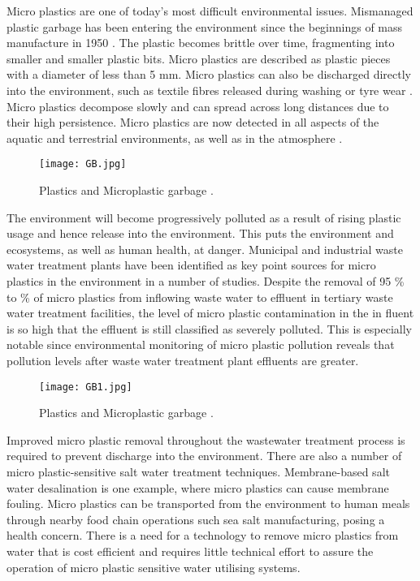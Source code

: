 \documentclass[12pt]{article}
\begin{document}
Micro plastics are one of today's most difficult environmental issues. Mismanaged plastic garbage has been entering the environment since the beginnings of mass manufacture in 1950 . The plastic becomes brittle over time, fragmenting into smaller and smaller plastic bits. Micro plastics are described as plastic pieces with a diameter of less than 5 mm. Micro plastics can also be discharged directly into the environment, such as textile fibres released during washing or tyre wear . Micro plastics decompose slowly and can spread across long distances due to their high persistence. Micro plastics are now detected in all aspects of the aquatic and terrestrial environments, as well as in the atmosphere .
\begin{figure}[h]
\centering
\texttt{[image: GB.jpg]}
\caption{Plastics and Microplastic garbage .}
\label{fig_ROB}
\end{figure}
The environment will become progressively polluted as a result of rising plastic usage and hence release into the environment. This puts the environment and ecosystems, as well as human health, at danger. Municipal and industrial waste water treatment plants have been identified as key point sources for micro plastics in the environment in a number of studies. Despite the removal of 95 \% to \% of micro plastics from inflowing waste water to effluent in tertiary waste water treatment facilities, the level of micro plastic contamination in the in fluent is so high that the effluent is still classified as severely polluted. This is especially notable since environmental monitoring of micro plastic pollution reveals that pollution levels after waste water treatment plant effluents are greater.
\begin{figure}[h]
\centering
\texttt{[image: GB1.jpg]}
\caption{Plastics and Microplastic garbage .}
\label{fig_ROB}
\end{figure}
Improved micro plastic removal throughout the wastewater treatment process is required to prevent discharge into the environment. There are also a number of micro plastic-sensitive salt water treatment techniques. Membrane-based salt water desalination is one example, where micro plastics can cause membrane fouling. Micro plastics can be transported from the environment to human meals through nearby food chain operations such sea salt manufacturing, posing a health concern. There is a need for a technology to remove micro plastics from water that is cost efficient and requires little technical effort to assure the operation of micro plastic sensitive water utilising systems.
\end{document}
